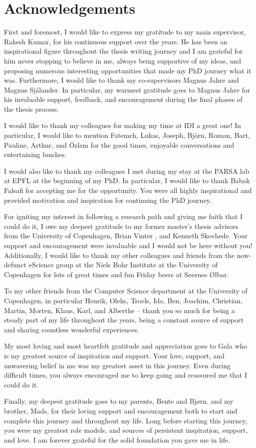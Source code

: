 \documentclass[../main.tex]{subfiles}
\begin{document}
\chapter{Acknowledgements}

First and foremost, I would like to express my gratitude to my main
supervisor, Rakesh Kumar, for his continuous support over the
years. He has been an inspirational figure throughout the thesis
writing journey and I am grateful for him never stopping to believe in
me, always being supportive of my ideas, and proposing numerous
interesting opportunities that made my PhD journey what it
was. Furthermore, I would like to thank my co-supervisors Magnus Jahre
and Magnus Sjálander. In particular, my warmest gratitude goes to
Magnus Jahre for his invaluable support, feedback, and encouragement
during the final phases of the thesis process.

I would like to thank my colleagues for making my time at IDI a
great one! In particular, I would like to mention Fatemeh, Lukas,
Joseph, Björn, Roman, Bart, Pauline, Arthur, and Özlem for the good
times, enjoyable conversations and entertaining lunches.

I would also like to thank my colleagues I met during my stay at the
PARSA lab at EPFL at the beginning of my PhD. In particular, I would
like to thank Babak Falsafi for accepting me for the opportunity. You
were all highly inspirational and provided motivation and inspiration
for continuing the PhD journey.

For igniting my interest in following a research path and giving me
faith that I could do it, I owe my deepest gratitude to my former
master's thesis advisors from the University of Copenhagen, Brian Vinter
, and Kenneth Skovhede. Your support and encouragement were invaluable and I would not be here without you! Additionally, I would like to thank my other colleagues and friends from the now-defunct eScience group at the Niels Bohr Institute at the University of Copenhagen for lots of great times and fun Friday beers at Søernes Ølbar.

To my other friends from the Computer Science department at the
University of Copenhagen, in particular Henrik, Oleks, Troels, Ida,
Ben, Joachim, Christian, Martin, Morten, Klaus, Karl, and Alberthe --
thank you so much for being a steady part of my life throughout the
years, being a constant source of support and sharing countless
wonderful experiences.

My most loving and most heartfelt gratitude and appreciation goes to
Gala who is my greatest source of inspiration and support. Your love,
support, and unwavering belief in me was my greatest asset in this
journey. Even during difficult times, you always encouraged me to keep
going and reassured me that I could do it.

Finally, my deepest gratitude goes to my parents, Bente and Bjørn. and
my brother, Mads, for their loving support and encouragement both to
start and complete this journey and throughout my life. Long before
starting this journey, you were my greatest role models, and sources of
persistent inspiration, support, and love. I am forever grateful for
the solid foundation you gave me in life.

\newpage
\end{document}
